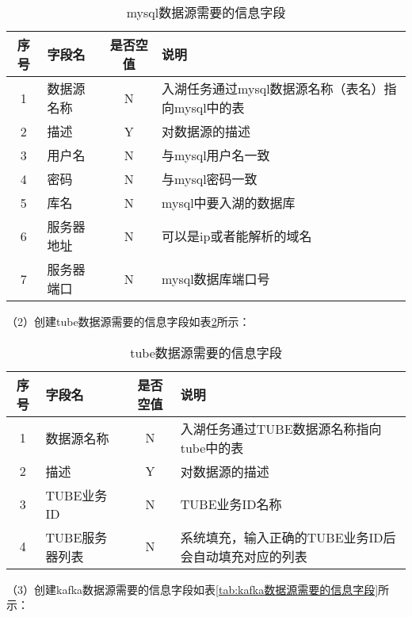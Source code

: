 \begin{table}[H]
  \centering
  \caption{mysql数据源需要的信息字段}
  \label{tab:mysql数据源需要的信息字段}
  \begin{tabular}{clcl}
    \toprule
    序号  & 字段名     & 是否空值   & 说明    \\
    \midrule
    1    & 数据源名称  & N        & 入湖任务通过mysql数据源名称（表名）指向mysql中的表 \\
    2    & 描述       & Y        & 对数据源的描述                                \\
    3    & 用户名     & N        & 与mysql用户名一致                             \\
    4    & 密码       & N        &  与mysql密码一致                             \\
    5    & 库名       & N        &   mysql中要入湖的数据库                       \\
    6    & 服务器地址  & N        &  可以是ip或者能解析的域名                      \\
    7    & 服务器端口  & N        &   mysql数据库端口号                          \\
    \bottomrule
  \end{tabular}
\end{table}

（2）创建tube数据源需要的信息字段如表\ref{tab:tube数据源需要的信息字段}所示：

\begin{table}[H]
  \centering
  \caption{tube数据源需要的信息字段}
  \label{tab:tube数据源需要的信息字段}
  \begin{tabular}{clcl}
    \toprule
    序号  & 字段名     & 是否空值   & 说明                                      \\
    \midrule
    1    & 数据源名称  & N        & 入湖任务通过TUBE数据源名称指向tube中的表 \\
    2    & 描述       & Y        & 对数据源的描述                                \\
    3    & TUBE业务ID     & N        & TUBE业务ID名称                             \\
    4    & TUBE服务器列表       & N        &  系统填充，输入正确的TUBE业务ID后会自动填充对应的列表         \\
    \bottomrule
  \end{tabular}
\end{table}

（3）创建kafka数据源需要的信息字段如表\ref{tab:kafka数据源需要的信息字段}所示：

